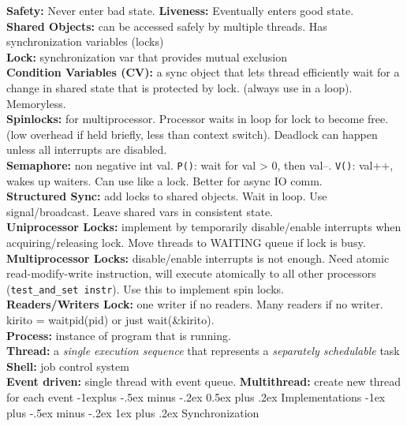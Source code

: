 \documentclass[8pt,landscape]{article}
\makeatletter
\renewcommand{\subsection}{\@startsection{subsection}{2}{0mm}%
                                {-1explus -.5ex minus -.2ex}%
                                {0.5ex plus .2ex}%
                                {\normalfont\normalsize\bfseries}}
\renewcommand{\subsubsection}{\@startsection{subsubsection}{3}{0mm}%
                                {-1ex plus -.5ex minus -.2ex}%
                                {1ex plus .2ex}%
                                {\normalfont\small\bfseries}}
\makeatother
\begin{document}
\begin{multicols}{3}
\begin{enumerate}
\end{enumerate}
\textbf{Safety:} Never enter bad state. \textbf{Liveness:} Eventually enters good state.\\ 
\textbf{Shared Objects:} can be accessed safely by multiple threads. Has synchronization variables (locks) \\ 
\textbf{Lock:} synchronization var that provides mutual exclusion \\
\textbf{Condition Variables (CV):} a sync object that lets thread efficiently wait for a change in shared state that is protected by lock. (always use in a loop). Memoryless.\\ 
\textbf{Spinlocks:} for multiprocessor. Processor waits in loop for lock to become free. (low overhead if held briefly, less than context switch). Deadlock can happen unless all interrupts are disabled. \\
\textbf{Semaphore:} non negative int val. {\tt P()}: wait for val > 0, then val--. {\tt V()}: val++, wakes up waiters. Can use like a lock. Better for async IO comm.\\ 
\textbf{Structured Sync:} add locks to shared objects. Wait in loop. Use signal/broadcast. Leave shared vars in consistent state.\\
\textbf{Uniprocessor Locks:} implement by temporarily disable/enable interrupts when acquiring/releasing lock. Move threads to WAITING queue if lock is busy. \\
\textbf{Multiprocessor Locks:} disable/enable interrupts is not enough. Need atomic read-modify-write instruction, will execute atomically to all other processors ({\tt test\_and\_set instr}). Use this to implement spin locks.\\
\textbf{Readers/Writers Lock:} one writer if no readers. Many readers if no writer. kirito = waitpid(pid) or just wait(\&kirito).\\ 
\textbf{Process:} instance of program that is running. \\
\textbf{Thread:} a {\it single execution sequence} that represents a {\it separately schedulable} task\\ 
\textbf{Shell:} job control system\\
\textbf{Event driven:} single thread with event queue. \textbf{Multithread:} create new thread for each event
\subsection{Implementations}
\subsubsection{Synchronization}

\end{multicols}
\end{document}
